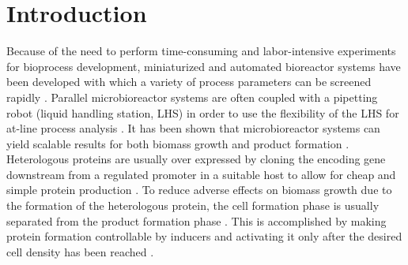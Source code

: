 \documentclass[sn-standardnature]{sn-jnl}%
\theoremstyle{thmstyleone}%
\theoremstyle{thmstyletwo}%
\theoremstyle{thmstylethree}%
\begin{document}
\section{Introduction}
\label{sec_intro}

Because of the need to perform time-consuming and labor-intensive experiments for bioprocess development, miniaturized and automated bioreactor systems have been developed with which a variety of process parameters can be screened rapidly \cite{weuster2005parallel,hemmerich2018microbioreactor}.
Parallel microbioreactor systems are often coupled with a pipetting robot (liquid handling station, LHS) in order to use the flexibility of the LHS for at-line process analysis \cite{haby2019integrated,puskeiler2005development,rohe2012automated}.
It has been shown that microbioreactor systems can yield scalable results for both biomass growth and product formation \cite{puskeiler2005development,schmideder2016high,kensy2009scale}.
Heterologous proteins are usually over expressed by cloning the encoding gene downstream from a regulated promoter in a suitable host to allow for cheap and simple protein production \cite{terpe2006overview}.
To reduce adverse effects on biomass growth due to the formation of the heterologous protein, the cell formation phase is usually separated from the product formation phase \cite{choi2000efficient,schmideder2016high,jahic2006process,neubauer2001expression}.
This is accomplished by making protein formation controllable by inducers and activating it only after the desired cell density has been reached \cite{neubauer2001expression}.
\end{document}
